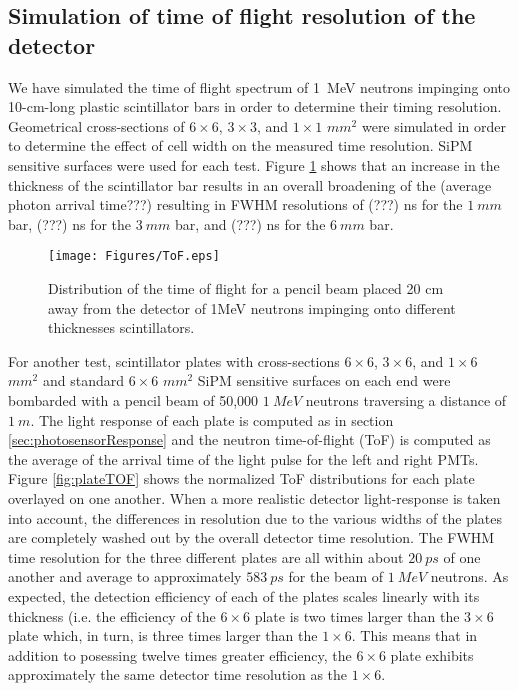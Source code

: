 \subsection{Simulation of time of flight resolution of the detector}

We have simulated the time of flight spectrum of 1~MeV neutrons impinging onto 10-cm-long plastic scintillator bars in order to determine their timing resolution. Geometrical cross-sections of $6 \times 6$, $3 \times 3$, and $1 \times 1$ $mm^{2}$ were simulated in order to determine the effect of cell width on the measured time resolution. SiPM sensitive surfaces were used for each test. Figure \ref{fig:ToF} shows that an increase in the thickness of the scintillator bar results in an overall broadening of the (average photon arrival time???) resulting in FWHM resolutions of (???) ns for the $1~mm$ bar, (???) ns for the $3~mm$ bar, and (???) ns for the $6~mm$ bar.

\begin{figure}[tb]
\centering
\texttt{[image: Figures/ToF.eps]}
\caption{Distribution of the time of flight for a pencil beam  placed 20 cm away from the detector of 1MeV  neutrons impinging onto different thicknesses scintillators.}
\label{fig:ToF}
\end{figure}

For another test, scintillator plates with cross-sections $6 \times 6$, $3 \times 6$, and $1 \times 6$ $mm^{2}$ and standard $6 \times 6$ $mm^{2}$ SiPM sensitive surfaces on each end were bombarded with a pencil beam of 50,000 $1~MeV$ neutrons traversing a distance of $1~m$. The light response of each plate is computed as in section \ref{sec:photosensorResponse} and the neutron time-of-flight (ToF) is computed as the average of the arrival time of the light pulse for the left and right PMTs. Figure \ref{fig:plateTOF} shows the normalized ToF distributions for each plate overlayed on one another. When a more realistic detector light-response is taken into account, the differences in resolution due to the various widths of the plates are completely washed out by the overall detector time resolution. The FWHM time resolution for the three different plates are all within about $20~ps$ of one another and average to approximately $583~ps$ for the beam of $1~MeV$ neutrons. As expected, the detection efficiency of each of the plates scales linearly with its thickness (i.e. the efficiency of the $6 \times 6$ plate is two times larger than the $3 \times 6$ plate which, in turn, is three times larger than the $1 \times 6$. This means that in addition to posessing twelve times greater efficiency, the $6 \times 6$ plate exhibits approximately the same detector time resolution as the $1 \times 6$.

